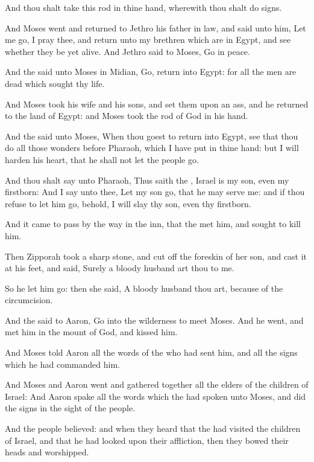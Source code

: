 \verse And thou shalt take this rod in thine hand, wherewith thou shalt
do signs.

\verse And Moses went and returned to Jethro his father in law, and said
unto him, Let me go, I pray thee, and return unto my brethren which
are in Egypt, and see whether they be yet alive. And Jethro said to
Moses, Go in peace.

\verse And the \LORD said unto Moses in Midian, Go, return into Egypt:
for all the men are dead which sought thy life.

\verse And Moses took his wife and his sons, and set them upon an ass,
and he returned to the land of Egypt: and Moses took the rod of God in
his hand.

\verse And the \LORD said unto Moses, When thou goest to return into
Egypt, see that thou do all those wonders before Pharaoh, which I have
put in thine hand: but I will harden his heart, that he shall not let
the people go.

\verse And thou shalt say unto Pharaoh, Thus saith the \LORD, Israel is
my son, even my firstborn: \verse And I say unto thee, Let my son go,
that he may serve me: and if thou refuse to let him go, behold, I will
slay thy son, even thy firstborn.

\verse And it came to pass by the way in the inn, that the \LORD met him,
and sought to kill him.

\verse Then Zipporah took a sharp stone, and cut off the foreskin of her
son, and cast it at his feet, and said, Surely a bloody husband art
thou to me.

\verse So he let him go: then she said, A bloody husband thou art,
because of the circumcision.

\verse And the \LORD said to Aaron, Go into the wilderness to meet Moses.
And he went, and met him in the mount of God, and kissed him.

\verse And Moses told Aaron all the words of the \LORD who had sent him,
and all the signs which he had commanded him.

\verse And Moses and Aaron went and gathered together all the elders of
the children of Israel: \verse And Aaron spake all the words which the
\LORD had spoken unto Moses, and did the signs in the sight of the
people.

\verse And the people believed: and when they heard that the \LORD had
visited the children of Israel, and that he had looked upon their
affliction, then they bowed their heads and worshipped.

